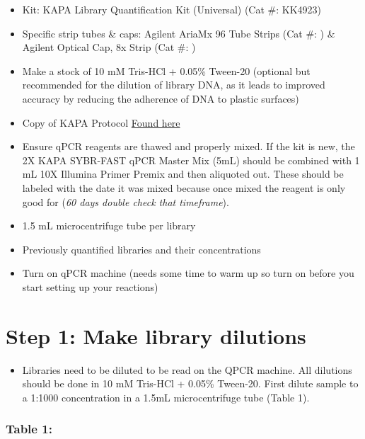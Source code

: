 \documentclass[
  letterpaper,
  DIV=11,
  numbers=noendperiod]{scrreprt}
\providecommand{\tightlist}{%
  \setlength{\itemsep}{0pt}\setlength{\parskip}{0pt}}\usepackage{longtable,booktabs,array}
\begin{document}
\begin{itemize}
\item
  Kit: KAPA Library Quantification Kit (Universal) (Cat \#: KK4923)
\item
  Specific strip tubes \& caps: Agilent AriaMx 96 Tube Strips (Cat \#: )
  \& Agilent Optical Cap, 8x Strip (Cat \#: )
\item
  Make a stock of 10 mM Tris-HCl + 0.05\% Tween-20 (optional but
  recommended for the dilution of library DNA, as it leads to improved
  accuracy by reducing the adherence of DNA to plastic surfaces)
\item
  Copy of KAPA Protocol
  \href{https://rochesequencingstore.com/wp-content/uploads/2017/10/KAPA-Lib-Quant-ILMN_9.17-IfU_1.pdf}{Found
  here}
\item
  Ensure qPCR reagents are thawed and properly mixed. If the kit is new,
  the 2X KAPA SYBR-FAST qPCR Master Mix (5mL) should be combined with 1
  mL 10X Illumina Primer Premix and then aliquoted out. These should be
  labeled with the date it was mixed because once mixed the reagent is
  only good for (\emph{60 days double check that timeframe}).
\item
  1.5 mL microcentrifuge tube per library
\item
  Previously quantified libraries and their concentrations
\item
  Turn on qPCR machine (needs some time to warm up so turn on before you
  start setting up your reactions)
\end{itemize}

\hypertarget{step-1-make-library-dilutions}{%
\section*{\texorpdfstring{\textbf{Step 1: Make library
dilutions}}{Step 1: Make library dilutions}}\label{step-1-make-library-dilutions}}


\begin{itemize}
\tightlist
\item
  Libraries need to be diluted to be read on the QPCR machine. All
  dilutions should be done in 10 mM Tris-HCl + 0.05\% Tween-20. First
  dilute sample to a 1:1000 concentration in a 1.5mL microcentrifuge
  tube (Table 1).
\end{itemize}

\hypertarget{table-1}{%
\subsubsection*{\texorpdfstring{\textbf{Table
1:}}{Table 1:}}\label{table-1}}
\end{document}
